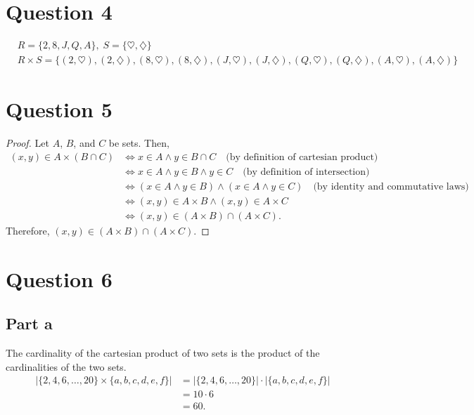 \documentclass{article}
\begin{document}
\section*{Question 4}
\begin{align*}
    &R = \{2, 8, J, Q, A\}, \; S = \{\heartsuit, \diamondsuit\} \\
    &R \times S = \{(2, \heartsuit), (2, \diamondsuit), (8, \heartsuit), (8, \diamondsuit), (J, \heartsuit), (J, \diamondsuit), (Q, \heartsuit), (Q, \diamondsuit), (A, \heartsuit), (A, \diamondsuit)\}
\end{align*}

\section*{Question 5}
\begin{proof}
    Let $A$, $B$, and $C$ be sets.
    Then,
    \begin{align*}
        (x, y) \in A \times (B \cap C) &\Longleftrightarrow x \in A \land y \in B \cap C \quad \text{(by definition of cartesian product)} \\
        &\Longleftrightarrow x \in A \land y \in B \land y \in C \quad \text{(by definition of intersection)} \\
        &\Longleftrightarrow (x \in A \land y \in B) \land (x \in A \land y \in C) \quad \text{(by identity and commutative laws)} \\
        &\Longleftrightarrow (x, y) \in A \times B \land (x, y) \in A \times C \\
        &\Longleftrightarrow (x, y) \in (A \times B) \cap (A \times C).
    \end{align*}
    Therefore, $(x, y) \in (A \times B) \cap (A \times C)$.
\end{proof}

\section*{Question 6}

\subsection*{Part a}
The cardinality of the cartesian product of two sets is the product of the cardinalities of the two sets.
\begin{align*}
    |\{2, 4, 6, \dots, 20\} \times \{a, b, c, d, e, f\}| &= |\{2, 4, 6, \dots, 20\}| \cdot |\{a, b, c, d, e, f\}| \\
    &= 10 \cdot 6 \\
    &= 60.
\end{align*}
\end{document}
